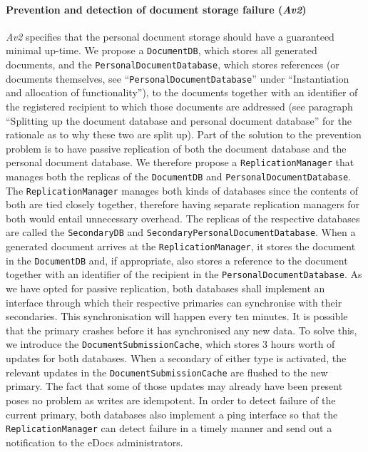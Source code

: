 \documentclass[a4paper,10pt]{article}
\begin{document}
\paragraph{Prevention and detection of document storage failure (\emph{Av2})}
\emph{Av2} specifies that the personal document storage should have a guaranteed minimal up-time. We propose a \texttt{DocumentDB}, which stores all generated documents, and the \texttt{PersonalDocumentDatabase}, which stores references (or documents themselves, see ``\texttt{PersonalDocumentDatabase}'' under ``Instantiation and allocation of functionality''),  to the documents together with an identifier of the registered recipient to which those documents are addressed (see paragraph ``Splitting up the document database and personal document database'' for the rationale as to why these two are split up). Part of the solution to the prevention problem is to have passive replication of both the document database and the personal document database. We therefore propose a \texttt{ReplicationManager} that manages both the replicas of the \texttt{DocumentDB} and \texttt{PersonalDocumentDatabase}. The \texttt{ReplicationManager} manages both kinds of databases since the contents of both are tied closely together, therefore having separate replication managers for both would entail unnecessary overhead. The replicas of the respective databases are called the \texttt{SecondaryDB} and \texttt{SecondaryPersonalDocumentDatabase}. When a generated document arrives at the \texttt{ReplicationManager}, it stores the document in the \texttt{DocumentDB} and, if appropriate, also stores a reference to the document together with an identifier of the recipient in the \texttt{PersonalDocumentDatabase}. As we have opted for passive replication, both databases shall implement an interface through which their respective primaries can synchronise with their secondaries. This synchronisation will happen every ten minutes. It is possible that the primary crashes before it has synchronised any new data. To solve this, we introduce the \texttt{DocumentSubmissionCache}, which stores 3 hours worth of updates for both databases. When a secondary of either type is activated, the relevant updates in the \texttt{DocumentSubmissionCache} are flushed to the new primary. The fact that some of those updates may already have been present poses no problem as writes are idempotent. In order to detect failure of the current primary, both databases also implement a ping interface so that the \texttt{ReplicationManager} can detect failure in a timely manner and send out a notification to the eDocs administrators.
\end{document}
